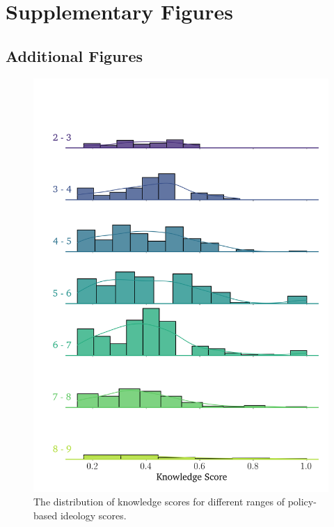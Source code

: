 \chapter{Supplementary Figures}

\label{AppendixB}


\section{Additional Figures}
\begin{figure}
	\begin{center}
		\includegraphics[width=.8\textwidth]{Figures/knowledge_pbs_dist.png}
	\end{center}
	\caption{The distribution of knowledge scores for different ranges of policy-based ideology scores.}\label{fig:knowledge_pbs}
\end{figure}

